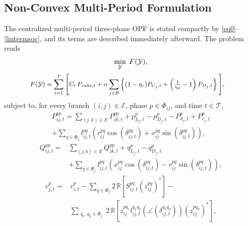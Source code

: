 \subsection{Non-Convex Multi-Period Formulation}
\label{ssec:nonconvex}

The centralized multi-period three-phase OPF is stated compactly by
\eqref{eq0}--\eqref{lintermsoc}, and its terms are described immediately
afterward. The problem reads
\begin{equation}\label{eq0}
\small
    \min_{\mathcal{Y}}\; F(\mathcal{Y}),
\end{equation}
\begin{equation}\label{eq1}
\begin{small}
\begin{aligned}
F(\mathcal{Y})=\sum_{t=1}^{T} \Bigg[
& C_{t}\,P_{subs,t}
+ \alpha \sum_{j \in \mathcal{B}} \left\{ (1 - \eta_c) P_{C_j,t}
+ \left( \tfrac{1}{\eta_d} - 1 \right) P_{D_j,t} \right\}
\Bigg],
\end{aligned}
\end{small}
\end{equation}
subject to, for every branch $(i,j)\in\mathcal{E}$, phase
$p\in\Phi_{ij}$, and time $t\in\mathcal{T}$,
\begin{equation}\label{eq2}
\begin{split}
P_{ij,t}^{pp}
= \sum_{(j,k)\in E} P_{jk,t}^{pp} + p_{L_j,t}^p
- p_{D_j,t}^p - P_{d_j,t}^p + P_{c_j,t}^p \\ + \sum_{q \in \Phi_j} l_{ij,t}^{pq}
\left( r_{ij}^{pq} \cos(\delta_{ij,t}^{pq}) + x_{ij}^{pq} \sin(\delta_{ij,t}^{pq}) \right),
\end{split}
\end{equation}
\begin{equation}\label{eq3}
\begin{split}
Q_{ij,t}^{pp}
= & \sum_{(j,k)\in E} Q_{jk,t}^{pp} + q_{L_j,t}^p - q_{D_j,t}^p \\
& + \sum_{q \in \Phi_j} l_{ij,t}^{pq}
\left( x_{ij}^{pq} \cos(\delta_{ij,t}^{pq}) - r_{ij}^{pq} \sin(\delta_{ij,t}^{pq}) \right),
\end{split}
\end{equation}
\begin{equation}\label{eq4}
\begin{split}
v_{j,t}^p =  & v_{i,t}^p
- \sum_{q \in \Phi_j} 2\,\mathbb{R}\!\left[ S_{ij,t}^{pq} \left( z_{ij}^{pq} \right)^* \right]- \\ & \sum_{\substack{q_1, q_2 \in \Phi_j}}
2\,\mathbb{R}\!\left[ z_{ij}^{pq_1} l_{ij,t}^{q_1 q_2}
\left( \angle(\delta_{ij,t}^{q_1 q_2}) \right)
\left( z_{ij}^{pq_2} \right)^* \right],
\end{split}
\end{equation}
